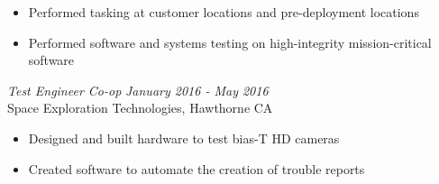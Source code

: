 \documentclass[line,mmmargin]{res}
\begin{document}
\begin{resume}
\begin{itemize}
		\item Performed tasking at customer locations and pre-deployment locations
		\item Performed software and systems testing on high-integrity mission-critical software
	\end{itemize}
	\vspace{-10pt}
{\sl  Test Engineer Co-op} \hfill {\sl January 2016 - May 2016}\\
	Space Exploration Technologies, Hawthorne CA
	\begin{itemize}  \itemsep -2pt %
		\item Designed and built hardware to test bias-T HD cameras
		\item Created software to automate the creation of trouble reports
	\end{itemize}
 




\end{resume}
\end{document}
